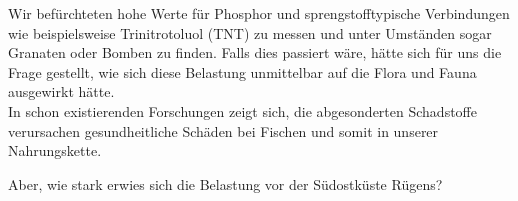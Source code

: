 Wir befürchteten hohe Werte für Phosphor und sprengstofftypische Verbindungen wie beispielsweise Trinitrotoluol (TNT) 
zu messen und unter Umständen sogar Granaten oder Bomben zu finden. Falls dies passiert wäre, hätte 
sich für uns die Frage gestellt, wie sich diese Belastung unmittelbar auf die Flora und Fauna ausgewirkt hätte. \\

In schon existierenden Forschungen zeigt sich, die abgesonderten Schadstoffe verursachen gesundheitliche Schäden bei Fischen 
und somit in unserer Nahrungskette.\cite{munitionsbelastung} 

Aber, wie stark erwies sich die Belastung vor der Südostküste Rügens?
%
%
%






